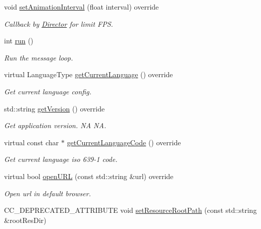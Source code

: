 \begin{DoxyCompactItemize}
\item 
void \hyperlink{classApplication_a760516339314580f5086173d006483cc}{set\+Animation\+Interval} (float interval) override
\begin{DoxyCompactList}\small\item\em Callback by \hyperlink{classDirector}{Director} for limit F\+PS. \end{DoxyCompactList}\item 
\mbox{\label{classApplication_a8cf8941c8db90117d3735bce5ae1fdf4}} 
int \hyperlink{classApplication_a8cf8941c8db90117d3735bce5ae1fdf4}{run} ()
\begin{DoxyCompactList}\small\item\em Run the message loop. \end{DoxyCompactList}\item 
virtual Language\+Type \hyperlink{classApplication_ac972f15de44614b03604fb4e3e05cab3}{get\+Current\+Language} () override
\begin{DoxyCompactList}\small\item\em Get current language config. \end{DoxyCompactList}\item 
\mbox{\label{classApplication_af44096b9ba5875ef44422526b4aa7a09}} 
std\+::string \hyperlink{classApplication_af44096b9ba5875ef44422526b4aa7a09}{get\+Version} () override
\begin{DoxyCompactList}\small\item\em Get application version.  NA  NA. \end{DoxyCompactList}\item 
virtual const char $\ast$ \hyperlink{classApplication_a47bfc4cd5a784ce46bd05e727b2e8781}{get\+Current\+Language\+Code} () override
\begin{DoxyCompactList}\small\item\em Get current language iso 639-\/1 code. \end{DoxyCompactList}\item 
virtual bool \hyperlink{classApplication_a13ccf5ab932de8a22255b56d085bed59}{open\+U\+RL} (const std\+::string \&url) override
\begin{DoxyCompactList}\small\item\em Open url in default browser. \end{DoxyCompactList}\item 
C\+C\+\_\+\+D\+E\+P\+R\+E\+C\+A\+T\+E\+D\+\_\+\+A\+T\+T\+R\+I\+B\+U\+TE void \hyperlink{classApplication_a0df1abee182d6a9f3d2a318941aace4f}{set\+Resource\+Root\+Path} (const std\+::string \&root\+Res\+Dir)

\end{DoxyCompactItemize}
